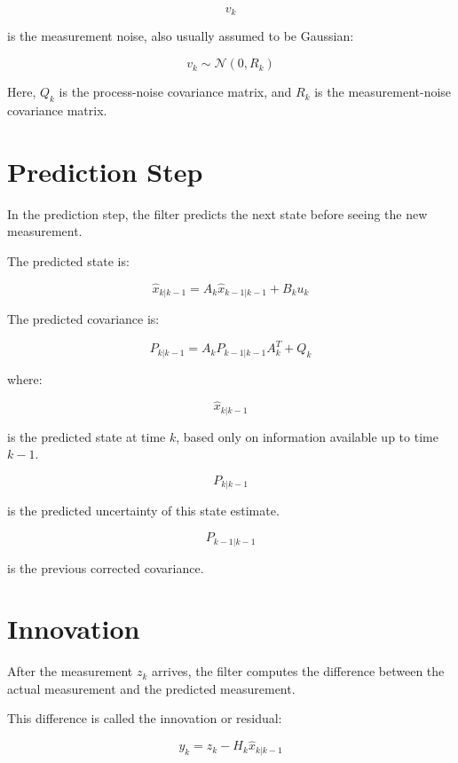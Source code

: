 \documentclass[a4paper]{article}
\begin{document}
        \[
            v_k
        \]
        
        is the measurement noise, also usually assumed to be Gaussian:
        
        \[
            v_k \sim \mathcal{N}(0, R_k)
        \]
        
        Here, \(Q_k\) is the process-noise covariance matrix, and \(R_k\) is the measurement-noise covariance matrix.
    
    
    \section{Prediction Step}
        
        In the prediction step, the filter predicts the next state before seeing the new measurement.
        
        The predicted state is:
        
        \[
            \hat{x}_{k|k-1} = A_k \hat{x}_{k-1|k-1} + B_k u_k
        \]
        
        The predicted covariance is:
        
        \[
            P_{k|k-1} = A_k P_{k-1|k-1} A_k^T + Q_k
        \]
        
        where:
        
        \[
            \hat{x}_{k|k-1}
        \]
        
        is the predicted state at time \(k\), based only on information available up to time \(k-1\).
        
        \[
            P_{k|k-1}
        \]
        
        is the predicted uncertainty of this state estimate.
        
        \[
            P_{k-1|k-1}
        \]
        
        is the previous corrected covariance.
    
    
    \section{Innovation}
        
        After the measurement \(z_k\) arrives, the filter computes the difference between the actual measurement and the predicted measurement.
        
        This difference is called the innovation or residual:
        
        \[
            y_k = z_k - H_k \hat{x}_{k|k-1}
        \]
        
\end{document}
